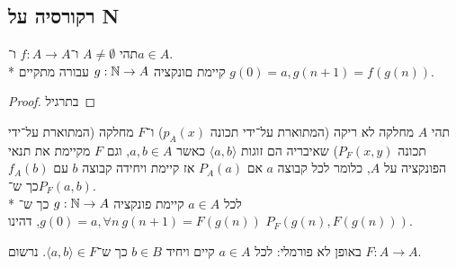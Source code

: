 \subsection{רקורסיה על N}
\begin{theorem}[רקורסיה]
	תהי $A \ne \emptyset$ ו־$f : A \to A$ ו־$a \in A$. \\*
	קיימת םונקציה $g : \mathbb{N} \to A$ עבורה מתקיים $g(0) = a, g(n + 1) = f(g(n))$.
\end{theorem}
\begin{proof}
	בתרגיל
\end{proof}
\begin{theorem}
	תהי $A$ מחלקה לא ריקה (המתוארת על־ידי תכונה $p_A(x)$) ו־$F$ מחלקה (המתוארת על־ידי תכונה $P_F(x, y)$) שאיבריה הם זוגות $\langle a, b \rangle$ כאשר $a, b \in A$,
	וגם $F$ מקיימת את תנאי הפונקציה על $A$, כלומר לכל קבוצה $a$ אם $P_A(a)$ אז קיימת ויחידה קבוצה $b$ עם $f_A(b)$ כך ש־$P_F(a, b)$. \\*
	לכל $a \in A$ קיימת פונקציה $g : \mathbb{N} \to A$ כך ש־$g(0) = a, \forall n\ g(n + 1) = F(g(n))$, דהינו $P_F(g(n), F(g(n)))$.
\end{theorem}
באופן לא פורמלי: לכל $a \in A$ קיים ויחיד $b \in B$ כך ש־$\langle a, b \rangle \in F$. נרשום $F : A \to A$.

